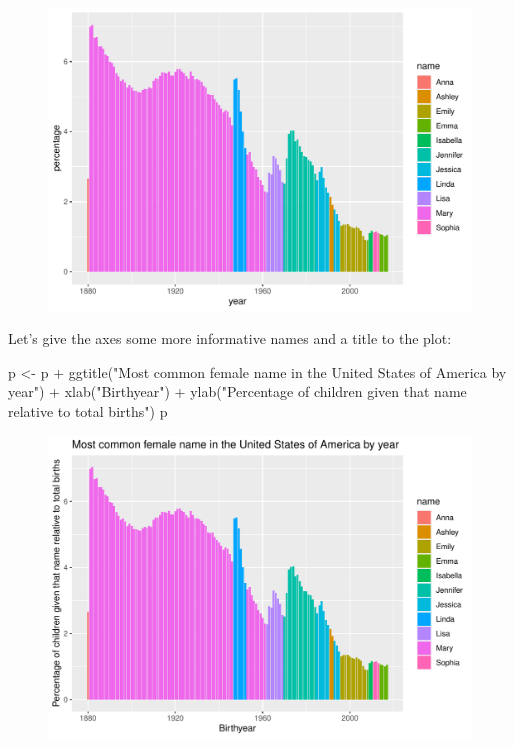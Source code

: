\documentclass[
  letterpaper,
  DIV=11,
  numbers=noendperiod]{scrartcl}
\newenvironment{Shaded}{\begin{snugshade}}{\end{snugshade}}
\newcommand{\FunctionTok}[1]{\textcolor[rgb]{0.28,0.35,0.67}{#1}}
\newcommand{\NormalTok}[1]{\textcolor[rgb]{0.00,0.23,0.31}{#1}}
\newcommand{\OtherTok}[1]{\textcolor[rgb]{0.00,0.23,0.31}{#1}}
\newcommand{\SpecialCharTok}[1]{\textcolor[rgb]{0.37,0.37,0.37}{#1}}
\newcommand{\StringTok}[1]{\textcolor[rgb]{0.13,0.47,0.30}{#1}}
\begin{document}
\begin{figure}[H]

{\centering \includegraphics{the_big_picture_files/figure-pdf/unnamed-chunk-13-1.pdf}

}

\end{figure}

Let's give the axes some more informative names and a title to the plot:

\begin{Shaded}
\begin{Highlighting}[]
\NormalTok{p }\OtherTok{\textless{}{-}}\NormalTok{ p }\SpecialCharTok{+}
  \FunctionTok{ggtitle}\NormalTok{(}\StringTok{"Most common female name in the United States of America by year"}\NormalTok{) }\SpecialCharTok{+}
  \FunctionTok{xlab}\NormalTok{(}\StringTok{"Birthyear"}\NormalTok{) }\SpecialCharTok{+}
  \FunctionTok{ylab}\NormalTok{(}\StringTok{"Percentage of children given that name relative to total births"}\NormalTok{)}
\NormalTok{p}
\end{Highlighting}
\end{Shaded}

\begin{figure}[H]

{\centering \includegraphics{the_big_picture_files/figure-pdf/unnamed-chunk-14-1.pdf}

}

\end{figure}
\end{document}
